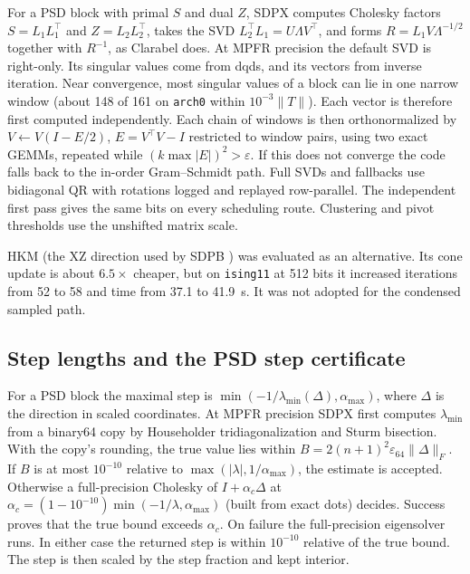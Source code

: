 \documentclass[11pt]{article}
\newcommand{\code}[1]{\texttt{#1}}
\newcommand{\eps}{\varepsilon}
\begin{document}
For a PSD block with primal $S$ and dual $Z$, SDPX computes Cholesky factors
$S = L_1L_1^\top$ and $Z = L_2L_2^\top$, takes the SVD
$L_2^\top L_1 = U\Lambda V^\top$, and forms $R = L_1V\Lambda^{-1/2}$ together
with $R^{-1}$, as Clarabel does. At MPFR precision the default SVD is
right-only. Its singular values come from dqds, and its vectors from inverse
iteration. Near convergence, most singular values of a block can lie in one
narrow window (about 148 of 161 on \code{arch0} within $10^{-3}\|T\|$). Each
vector is therefore first computed independently. Each chain of windows is
then orthonormalized by $V \leftarrow V(I - E/2)$, $E = V^\top V - I$
restricted to window pairs, using two exact GEMMs, repeated while
$(k\max|E|)^2>\eps$. If this does not converge the code falls back to the
in-order Gram--Schmidt path. Full SVDs and fallbacks use bidiagonal QR with
rotations logged and replayed row-parallel. The independent first pass gives
the same bits on every scheduling route. Clustering and pivot thresholds use
the unshifted matrix scale.

HKM (the XZ direction used by SDPB \cite{Helmberg1996}) was
evaluated as an alternative. Its cone update is about $6.5\times$ cheaper, but
on \code{ising11} at 512 bits it increased iterations from 52 to 58 and time
from 37.1 to 41.9~s. It was not adopted for the condensed sampled path.

\subsection{Step lengths and the PSD step certificate}
\label{sec:steps}

For a PSD block the maximal step is $\min(-1/\lambda_{\min}(\Delta),
\alpha_{\max})$, where $\Delta$ is the direction in scaled coordinates. At
MPFR precision SDPX first computes $\lambda_{\min}$ from a binary64 copy by
Householder tridiagonalization and Sturm bisection. With the copy's rounding,
the true value lies within $B = 2(n+1)^2\eps_{64}\|\Delta\|_F$. If $B$ is at
most $10^{-10}$ relative to $\max(|\lambda|, 1/\alpha_{\max})$, the estimate is
accepted. Otherwise a full-precision Cholesky of
$I+\alpha_c\Delta$ at $\alpha_c=(1-10^{-10})\min(-1/\lambda,\alpha_{\max})$
(built from exact dots) decides. Success proves that the true bound exceeds
$\alpha_c$. On failure the full-precision eigensolver runs. In either case the
returned step is within $10^{-10}$ relative of the true bound. The step is
then scaled by the step fraction and kept interior.
\end{document}
